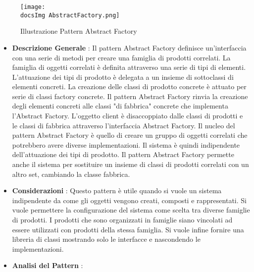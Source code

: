 {{{			\begin{figure}[h]
				\centering
				\texttt{[image: \\docsImg AbstractFactory.png]}
				\caption{Illustrazione Pattern Abstract Factory}
				\label{Illustrazione Pattern Abstract Factory}
			\end{figure}
			
			\begin{itemize}\itemsep1pt
				\item \textbf{Descrizione Generale} : Il pattern Abstract Factory definisce un'interfaccia con una serie di metodi per creare una famiglia di prodotti correlati. La famiglia di oggetti correlati è definita attraverso una serie di tipi di elementi. L'attuazione dei tipi di prodotto è delegata a un insieme di sottoclassi di elementi concreti. La creazione delle classi di prodotto concrete è attuato per serie di classi factory concrete. Il pattern Abstract Factory rinvia la creazione degli elementi concreti alle classi "di fabbrica" concrete che implementa l'Abstract Factory. L'oggetto client è disaccoppiato dalle classi di prodotti e le classi di fabbrica attraverso l'interfaccia Abstract Factory. Il nucleo del pattern Abstract Factory è quello di creare un gruppo di oggetti correlati che potrebbero avere diverse implementazioni. Il sistema è quindi indipendente dell'attuazione dei tipi di prodotto. Il pattern Abstract Factory permette anche il sistema per sostituire un insieme di classi di prodotti correlati con un altro set, cambiando la classe fabbrica.
				\item \textbf{Considerazioni} : Questo pattern è utile quando si vuole un sistema indipendente da come gli oggetti vengono creati, composti e rappresentati. Si vuole permettere la configurazione del sistema come scelta tra diverse famiglie di prodotti. I prodotti che sono organizzati in famiglie siano vincolati ad essere utilizzati con prodotti della stessa famiglia. Si vuole infine fornire una libreria di classi mostrando solo le interfacce e nascondendo le implementazioni.
				\item \textbf{Analisi del Pattern} : \hfill
				

\end{itemize}}}}
